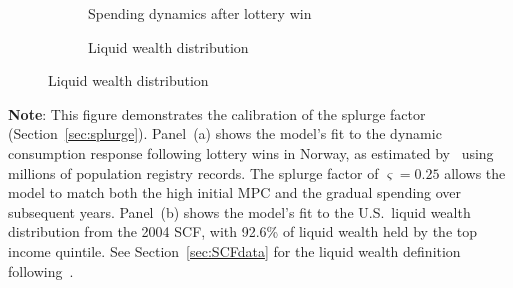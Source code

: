 \documentclass[\latexroot/\projectname]{subfiles}
\begin{document}
\begin{figure}[H]
  \centering
  \caption{\pregenmark Model fit to spending behavior and wealth distribution}
  \whenintegrated{\label{fig:splurge_estimation}} %
  \noindent\begin{minipage}{\textwidth}
    \centering
    \begin{subfigure}[b]{.48\linewidth}
      \centering
      \caption{Spending dynamics after lottery win}
      \whenintegrated{\label{fig:aggmpclotterywin}} %
    \end{subfigure}
    \hfill
    \begin{subfigure}[b]{.48\linewidth}
      \centering
      \caption{Liquid wealth distribution}
      \whenintegrated{\label{fig:liquwealthdistribution}} %
    \end{subfigure}
  \end{minipage}
\end{figure}
\noindent\parbox{\textwidth}{\footnotesize
  \textbf{Note}: This figure demonstrates the calibration of the splurge factor (Section~\ref{sec:splurge}).
  Panel~(a) shows the model's fit to the dynamic consumption response following lottery wins in Norway,
  as estimated by~\cite{fagereng-mpc-2021} using millions of population registry records.
  The splurge factor of $\varsigma = 0.25$ allows the model to match both the high initial MPC
  and the gradual spending over subsequent years.
  Panel~(b) shows the model's fit to the U.S.\ liquid wealth distribution from the 2004 SCF,
  with 92.6\% of liquid wealth held by the top income quintile.
  See Section~\ref{sec:SCFdata} for the liquid wealth definition following~\cite{kaplan2014model}.
}

\vspace{0.5em}  

\smartbib
\end{document}
